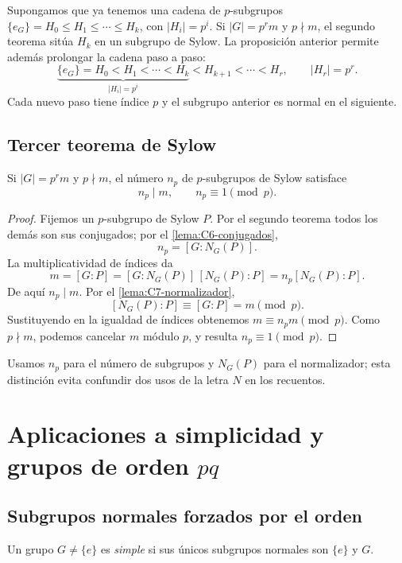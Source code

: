 Supongamos que ya tenemos una cadena de $p$-subgrupos $\{e_G\}=H_0\le H_1\le\cdots\le H_k$, con $|H_i|=p^i$. Si $|G|=p^r m$ y $p\nmid m$, el segundo teorema sitúa $H_k$ en un subgrupo de Sylow. La proposición anterior permite además prolongar la cadena paso a paso:
\[
\underbrace{\{e_G\}=H_0<H_1<\cdots<H_k}_{|H_i|=p^i}
<H_{k+1}<\cdots<H_r,\qquad |H_r|=p^r.
\]
Cada nuevo paso tiene índice $p$ y el subgrupo anterior es normal en el siguiente.

\subsection{Tercer teorema de Sylow}
\begin{teo}\label{teo:C7-sylow-III}
Si $|G|=p^r m$ y $p\nmid m$, el número $n_p$ de $p$-subgrupos de Sylow satisface
\[
n_p\mid m,\qquad n_p\equiv1\pmod p.
\]
\end{teo}
\begin{proof}
Fijemos un $p$-subgrupo de Sylow $P$. Por el segundo teorema todos los demás son sus conjugados; por el \cref{lema:C6-conjugados},
\[
n_p=[G:N_G(P)].
\]
La multiplicatividad de índices da
\[
m=[G:P]=[G:N_G(P)]\,[N_G(P):P]
=n_p[N_G(P):P].
\]
De aquí $n_p\mid m$. Por el \cref{lema:C7-normalizador},
\[
[N_G(P):P]\equiv[G:P]=m\pmod p.
\]
Sustituyendo en la igualdad de índices obtenemos $m\equiv n_pm\pmod p$. Como $p\nmid m$, podemos cancelar $m$ módulo $p$, y resulta $n_p\equiv1\pmod p$.
\end{proof}
Usamos $n_p$ para el número de subgrupos y $N_G(P)$ para el normalizador; esta distinción evita confundir dos usos de la letra $N$ en los recuentos.

\section{Aplicaciones a simplicidad y grupos de orden \texorpdfstring{$pq$}{pq}}
\subsection{Subgrupos normales forzados por el orden}
\begin{defi}
Un grupo $G\ne\{e\}$ es \emph{simple} si sus únicos subgrupos normales son $\{e\}$ y $G$.
\end{defi}

